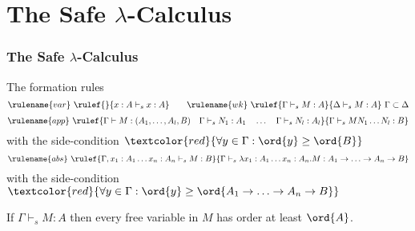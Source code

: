 \section{The Safe \texorpdfstring{$\lambda$}{Lambda}-Calculus}
\begin{frame} \frametitle{The Safe $\lambda$-Calculus}

\begin{block}{The formation rules}
$$ \rulename{var} \   \rulef{}{x : A\vdash_s x : A}
\qquad  \rulename{wk} \   \rulef{\Gamma \vdash_s M : A}{\Delta \vdash_s
M : A} \ \Gamma \subset \Delta$$
$$ \rulename{app} \  \rulef{\Gamma \vdash M : (A_1,\ldots,A_l,B)
                                        \quad \Gamma \vdash_s N_1 : A_1
                                        \quad \ldots \quad \Gamma \vdash_s N_l : A_l  }
                                   {\Gamma  \vdash_s M N_1 \ldots N_l : B}$$
\hfill with the side-condition $\textcolor{red}{\forall y \in \Gamma
: \ord{y} \geq \ord{B}}$
$$ \rulename{abs} \   \rulef{\Gamma, x_1:A_1 \ldots x_n : A_n \vdash_s M : B}
                                   {\Gamma  \vdash_s \lambda x_1:A_1 \ldots x_n : A_n . M : A_1 \rightarrow \ldots \rightarrow A_n \rightarrow B}$$
\hfill with the side-condition $\textcolor{red}{\forall y \in \Gamma
: \ord{y} \geq \ord{A_1 \rightarrow \ldots \rightarrow A_n
\rightarrow B}}$
\end{block}

\begin{lemma}
  If $\Gamma \vdash_s M : A$ then every free variable in $M$ has order at least $\ord{A}$.
\end{lemma}

\end{frame}


